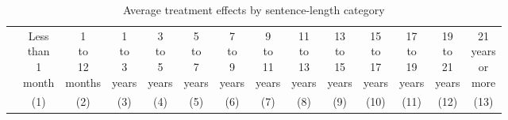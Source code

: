 \begin{table}[!htpb]\centering
\caption{Average treatment effects by sentence-length category}
\label{tab:att_sentence_categories}
\scriptsize
\begin{threeparttable}
\begin{adjustbox}{max width=\textwidth}
\begin{tabular}{@{\extracolsep{0pt}}lccccccccccccc}
\hline\hline
 & \shortstack{Less\\ than\\ 1\\ month} & \shortstack{1\\ to\\ 12\\ months} & \shortstack{1\\ to\\ 3\\ years} & \shortstack{3\\ to\\ 5\\ years} & \shortstack{5\\ to\\ 7\\ years} & \shortstack{7\\ to\\ 9\\ years} & \shortstack{9\\ to\\ 11\\ years} & \shortstack{11\\ to\\ 13\\ years} & \shortstack{13\\ to\\ 15\\ years} & \shortstack{15\\ to\\ 17\\ years} & \shortstack{17\\ to\\ 19\\ years} & \shortstack{19\\ to\\ 21\\ years} & \shortstack{21\\ years\\ or\\ more} \\
 & (1) & (2) & (3) & (4) & (5) & (6) & (7) & (8) & (9) & (10) & (11) & (12) & (13) \\

\end{tabular}
\end{adjustbox}
\end{threeparttable}
\end{table}
